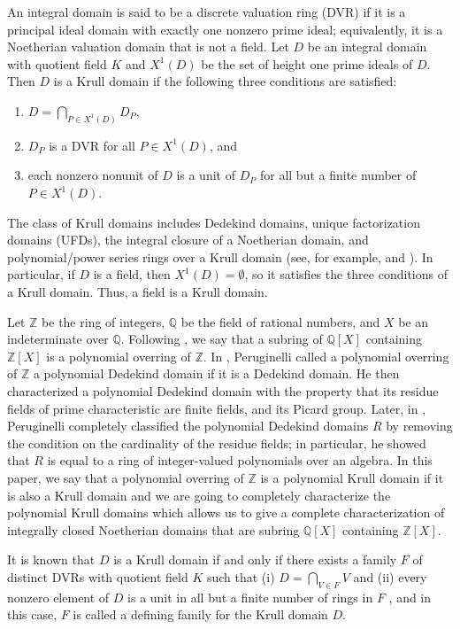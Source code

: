 \documentclass[10pt]{article}
\numberwithin{equation}{section}
\theoremstyle{definition}
\theoremstyle{definition}
\newcommand{\Q}{\mathbb{Q}}
\newcommand{\Z}{\mathbb{Z}}
\begin{document}
\medskip
An integral domain is said to be a discrete valuation ring (DVR) if it is a principal ideal domain with exactly one nonzero prime ideal; equivalently, it is a Noetherian valuation domain that is not a field. Let $D$ be an integral domain with quotient field $K$ and $X^1(D)$ be the set of height one prime ideals of $D$.
Then $D$ is a Krull domain if the following three conditions are satisfied:
\begin{enumerate}
\item[{(a)}] $D = \bigcap\limits_{P \in X^1(D)}D_P$,
\item[{(b)}] $D_P$ is a DVR for all $P \in X^1(D)$, and
\item[{(c)}] each nonzero nonunit of $D$ is a unit of $D_P$ for all but a finite number of $P \in X^1(D)$.
\end{enumerate}
The class of Krull domains includes Dedekind domains, unique factorization domains (UFDs),
the integral closure of a Noetherian domain, and polynomial/power series rings over a Krull domain (see, for example, \cite{Fossum} and \cite{Gilm}). In particular, if $D$ is a field, then $X^1(D) = \emptyset$, so it satisfies the three conditions of a Krull domain. Thus, a field is a Krull domain.

Let $\Z$ be the ring of integers, $\Q$ be the field of rational numbers,
and $X$ be an indeterminate over $\Q$. Following \cite{Chang}, we say that
a subring of $\Q[X]$ containing $\Z[X]$ is a polynomial overring of $\Z$.
 In \cite{PerDedekind}, Peruginelli called a polynomial overring of $\mathbb{Z}$
a polynomial Dedekind domain if it is a Dedekind domain. He then characterized
a polynomial Dedekind domain with the property that its residue fields of prime characteristic are
finite fields, and its Picard group. Later, in \cite{PerStacked}, Peruginelli
completely classified the polynomial Dedekind domains $R$ by removing the condition on the cardinality of the residue fields;
in particular, he showed that $R$ is equal to a ring of integer-valued polynomials over an algebra.
In this paper, we say that a polynomial overring of $\Z$ is a polynomial Krull domain if
it is also a Krull domain and we are going to completely characterize the polynomial Krull domains which allows us to give a complete characterization of integrally closed Noetherian domains that are subring $\Q[X]$ containing $\Z[X]$.


It is known that $D$ is a Krull domain if and only if there exists a family $F$ of distinct DVRs with quotient field $K$ such that 
(i) $D = \bigcap\limits_{V \in F}V$ and (ii) every nonzero element of $D$ is a unit in all 
but a finite number of rings in $F$ \cite[Proposition 3]{n55}, and in this case, $F$ is called a defining family for the Krull domain $D$.
\end{document}
